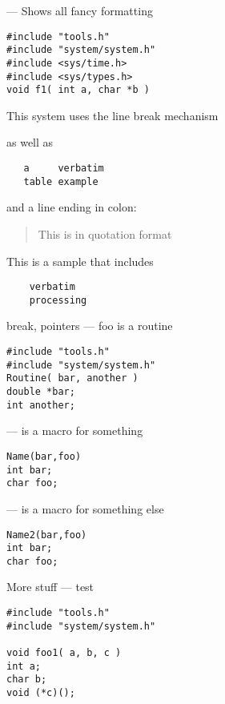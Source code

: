 \startmanpage
{}
--- Shows all fancy formatting 
\startvb\begin{verbatim}
#include "tools.h"
#include "system/system.h"
#include <sys/time.h> 
#include <sys/types.h> 
void f1( int a, char *b )
\end{verbatim}
\endvb

\par
{}
\par
{}
This system uses the line
\nextline
break mechanism
\nextline
\par
as well as
\begin{verbatim}
   a     verbatim
   table example
\end{verbatim}

and a line ending in colon:
\par
\begin{quotation}\noindent
This is in quotation format
\end{quotation}
\par
\par
{}
This is a sample that includes
\begin{verbatim}
    verbatim 
    processing
\end{verbatim}

\par
{}
break, pointers
\nextline
{}
\endmanpage
\startmanpage
{}
--- foo is a routine  
\startvb\begin{verbatim}
#include "tools.h"
#include "system/system.h"
Routine( bar, another )
double *bar;
int another;
\end{verbatim}
\endvb

\par
{}
\endmanpage
\startmanpage
{}
--- is a macro for something 
\startvb\begin{verbatim}
Name(bar,foo)
int bar;
char foo;
\end{verbatim}
\endvb

\endmanpage
\startmanpage
{}
--- is a macro for something else 
\startvb\begin{verbatim}
Name2(bar,foo)
int bar;
char foo;
\end{verbatim}
\endvb
More stuff
\endmanpage
\startmanpage
{}
--- test  
\startvb\begin{verbatim}
#include "tools.h"
#include "system/system.h"

void foo1( a, b, c )
int a;
char b;
void (*c)();
\end{verbatim}
\endvb

